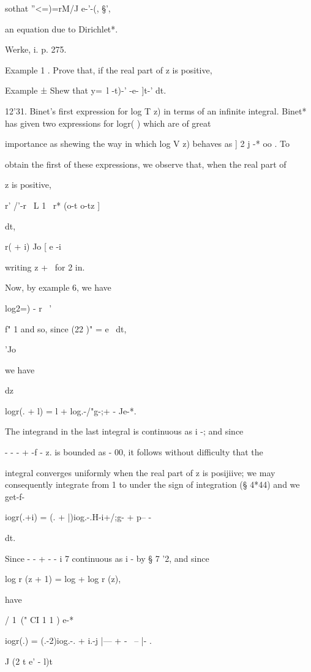 sothat ''<=)=rM/J e-'-(, §',

an equation due to Dirichlet*.

Werke, i. p. 275.

%
%

Example 1 . Prove that, if the real part of z is positive,

Example ± Shew that y=\ l -t)-' -e- ]t-' dt. 

12'31. Binet's first expression for log T z) in terms of an infinite
integral. Binet* has given two expressions for logr( ) which are of
great

importance as shewing the way in which log V z) behaves as ] 2 j -* oo
. To

obtain the first of these expressions, we observe that, when the real
part of

z is positive,

r' /'-r \ L 1 \ r* (o-t o-tz ]

dt,

r( + i) Jo [ e -i

writing z + \ for 2 in.

Now, by example 6, we have

log2=) - r~ '

f" 1 and so, since (22 )" = e~ dt,

'Jo

we have

dz

logr(. + l) = l + log.-/"g-;+ - Je-*.

The integrand in the last integral is continuous as i -; and since

- - - + -f - z. is bounded as - 00, it follows without difficulty
that the

integral converges uniformly when the real part of z is posijiive; we
may consequently integrate from 1 to under the sign of integration (§
4*44) and we get-f-

iogr(.+i) = (. + |)iog.-.H-i+/;g- + p-- -

dt.

Since - - + - - i 7 continuous as i - by § 7 '2, and since

log r (z + 1) = log + log r (z),

have

/ 1\ (" CI 1 1 ) e-*

iogr(.) = (.-2)iog.-. + i.-j |--- + - \ -- |- .

J (2 t e' - l)t

